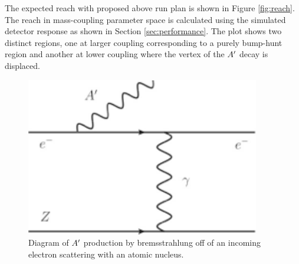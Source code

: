 The expected reach with proposed above run plan is shown in Figure \ref{fig:reach}. The reach in mass-coupling parameter space is calculated using the simulated detector response as shown in Section \ref{sec:performance}.  The plot shows two distinct regions,  one at larger coupling corresponding to a purely bump-hunt region and another at lower coupling where the vertex of the $A^\prime$ decay is displaced.  



\begin{figure}
\includegraphics[scale=1]{measurements/Aprime-diagram.pdf}
\caption{Diagram of  $A^\prime$ production by bremsstrahlung off of an incoming electron scattering with an atomic nucleus.}
\label{fig:apdiagram}
\end{figure}

